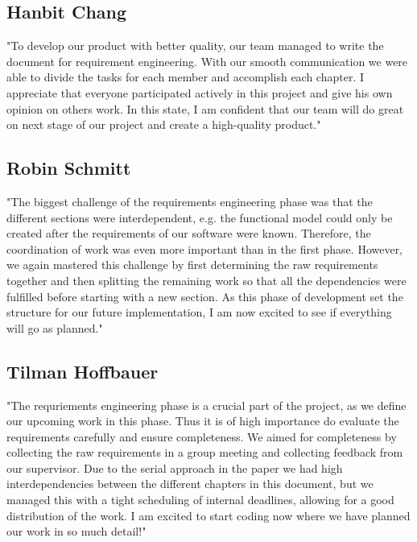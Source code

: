 \documentclass{article}
\begin{document}
\subsection{Hanbit Chang}
"To develop our product with better quality, our team managed to write the document for requirement engineering. With our smooth communication we were able to divide the tasks for each member and accomplish each chapter. I appreciate that everyone participated actively in this project and give his own opinion on others work. In this state, I am confident that our team will do great on next stage of our project and create a high-quality product."

\subsection{Robin Schmitt}

"The biggest challenge of the requirements engineering phase was that the different sections were interdependent, e.g. the functional model could only be created after the requirements of our software were known. Therefore, the coordination of work was even more important than in the first phase. However, we again mastered this challenge by first determining the raw requirements together and then splitting the remaining work so that all the dependencies were fulfilled before starting with a new section. As this phase of development set the structure for our future implementation, I am now excited to see if everything will go as planned."

\subsection{Tilman Hoffbauer}
"The requriements engineering phase is a crucial part of the project, as we define our upcoming work in this phase.
Thus it is of high importance do evaluate the requirements carefully and ensure completeness.
We aimed for completeness by collecting the raw requirements in a group meeting and collecting feedback from our supervisor.
Due to the serial approach in the paper we had high interdependencies between the different chapters in this document, but we managed this with a tight scheduling of internal deadlines, allowing for a good distribution of the work.
I am excited to start coding now where we have planned our work in so much detail!"




\end{document}
